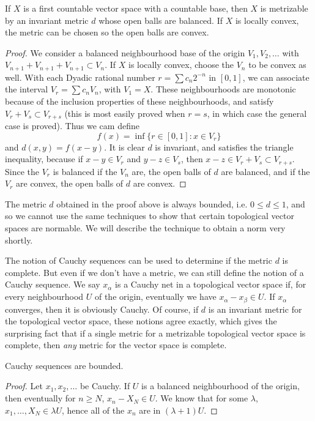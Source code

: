 \begin{theorem}
    If $X$ is a first countable vector space with a countable base, then $X$ is metrizable by an invariant metric $d$ whose open balls are balanced. If $X$ is locally convex, the metric can be chosen so the open balls are convex.
\end{theorem}
\begin{proof}
    We consider a balanced neighbourhood base of the origin $V_1, V_2, \dots$ with $V_{n+1} + V_{n+1} + V_{n+1} \subset V_n$. If $X$ is locally convex, choose the $V_n$ to be convex as well. With each Dyadic rational number $r = \sum c_n 2^{-n}$ in $[0,1]$, we can associate the interval $V_r = \sum c_n V_n$, with $V_1 = X$. These neighbourhoods are monotonic because of the inclusion properties of these neighbourhoods, and satisfy $V_r + V_s \subset V_{r+s}$ (this is most easily proved when $r = s$, in which case the general case is proved). Thus we cam define
    \[ f(x) = \inf \{ r \in [0,1] : x \in V_r \} \]
    and $d(x,y) = f(x-y)$. It is clear $d$ is invariant, and satisfies the triangle inequality, because if $x - y \in V_r$ and $y - z \in V_s$, then $x - z \in V_r + V_s \subset V_{r + s}$. Since the $V_r$ is balanced if the $V_n$ are, the open balls of $d$ are balanced, and if the $V_r$ are convex, the open balls of $d$ are convex.
\end{proof}

\begin{remark}
    The metric $d$ obtained in the proof above is always bounded, i.e. $0 \leq d \leq 1$, and so we cannot use the same techniques to show that certain topological vector spaces are normable. We will describe the technique to obtain a norm very shortly.
\end{remark}

The notion of Cauchy sequences can be used to determine if the metric $d$ is complete. But even if we don't have a metric, we can still define the notion of a Cauchy sequence. We say $x_\alpha$ is a Cauchy net in a topological vector space if, for every neighbourhood $U$ of the origin, eventually we have $x_\alpha - x_\beta \in U$. If $x_\alpha$ converges, then it is obviously Cauchy. Of course, if $d$ is an invariant metric for the topological vector space, these notions agree exactly, which gives the surprising fact that if a single metric for a metrizable topological vector space is complete, then {\it any} metric for the vector space is complete.

\begin{theorem}
    Cauchy sequences are bounded.
\end{theorem}
\begin{proof}
    Let $x_1, x_2, \dots$ be Cauchy. If $U$ is a balanced neighbourhood of the origin, then eventually for $n \geq N$, $x_n - X_N \in U$. We know that for some $\lambda$, $x_1, \dots, X_N \in \lambda U$, hence all of the $x_n$ are in $(\lambda + 1)U$.
\end{proof}

